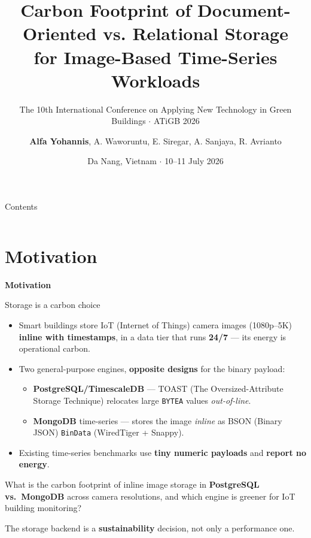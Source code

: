 \documentclass[aspectratio=169, table]{beamer}
\subtitle{The 10th International Conference on Applying New
Technology in Green Buildings $\cdot$ ATiGB 2026}
\title{Carbon Footprint of Document-\\[1pt]
  Oriented vs. Relational Storage\\[1pt] 
  for Image-Based Time-Series\\[1pt] 
  Workloads\\[1pt]
}
\author{\textbf{Alfa Yohannis}, A. Waworuntu, E. Siregar, A. Sanjaya, R. Avrianto}
\date{Da Nang, Vietnam $\cdot$ 10--11 July 2026}
\newcommand{\sectionframe}[1]{%
  \begin{frame}{\hfill}
    \centering
    \Huge{\textbf{#1}}
  \end{frame}
}
\newcommand{\takeaway}[1]{%
  \vspace{3pt}
  {\footnotesize #1}
}
\begin{document}
\frame{\titlepage}

\begin{frame}{Contents}
  \vspace{12pt}
  \begin{columns}[t]
    \tableofcontents[sections={1-2}]
    \tableofcontents[sections={3-4}]
  \end{columns}
\end{frame}

\section{Motivation}
\sectionframe{Motivation}

\begin{frame}{Storage is a carbon choice}
  \vspace{2pt}
  \footnotesize
  \begin{itemize}\setlength{\itemsep}{3pt}
    \item Smart buildings store IoT (Internet of Things) camera images (1080p--5K) \textbf{inline with timestamps}, in a data tier that runs \textbf{24/7} --- its energy is operational carbon.
    \item Two general-purpose engines, \textbf{opposite designs} for the binary payload:
      \begin{itemize}\footnotesize
        \item \textbf{PostgreSQL/TimescaleDB} --- TOAST (The Oversized-Attribute Storage Technique) relocates large \texttt{BYTEA} values \emph{out-of-line}.
        \item \textbf{MongoDB} time-series --- stores the image \emph{inline} as BSON (Binary JSON) \texttt{BinData} (WiredTiger + Snappy).
      \end{itemize}
    \item Existing time-series benchmarks use \textbf{tiny numeric payloads} and \textbf{report no energy}.
  \end{itemize}
  \vspace{2pt}
  \begin{rqbox}\footnotesize What is the carbon footprint of inline image storage in \textbf{PostgreSQL vs.\ MongoDB} across camera resolutions, and which engine is greener for IoT building monitoring?
  \end{rqbox}
  \takeaway{The storage backend is a \textbf{sustainability} decision, not only a performance one.}
\end{frame}
\end{document}
